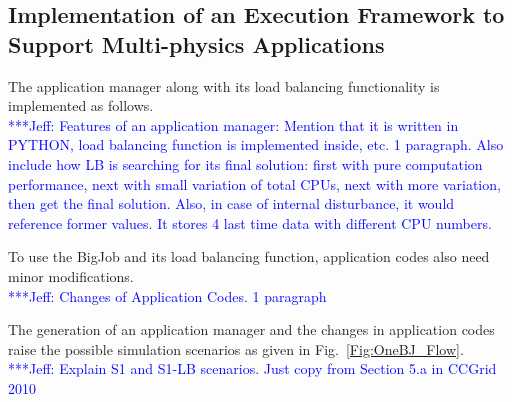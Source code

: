 \documentclass[conference,final]{IEEEtran}
\newcommand{\skonote}[1]{ {\textcolor{blue} { ***Jeff: #1 }}}
\newcommand{\skonote}[1]{}
\begin{document}
\newline
\newline


\subsection{Implementation of an Execution Framework to Support Multi-physics Applications}

The application manager along with its load balancing functionality is implemented as follows.\\
\skonote{Features of an application manager: Mention that it is written in PYTHON, load balancing function is implemented inside, etc. 1 paragraph. Also include how LB is searching for its final solution: first with pure computation performance, next with small variation of total CPUs, next with more variation, then get the final solution. Also, in case of internal disturbance, it would reference former values. It stores 4 last time data with different CPU numbers.}
\newline
\newline


To use the BigJob and its load balancing function, application codes also need minor modifications.\\
\skonote{Changes of Application Codes. 1 paragraph}
\newline
\newline


The generation of an application manager and the changes in application codes raise the possible simulation scenarios as given in Fig.~\ref{Fig:OneBJ_Flow}.\\
\skonote{Explain S1 and S1-LB scenarios. Just copy from Section 5.a in CCGrid 2010}
\newline
\newline
\end{document}
